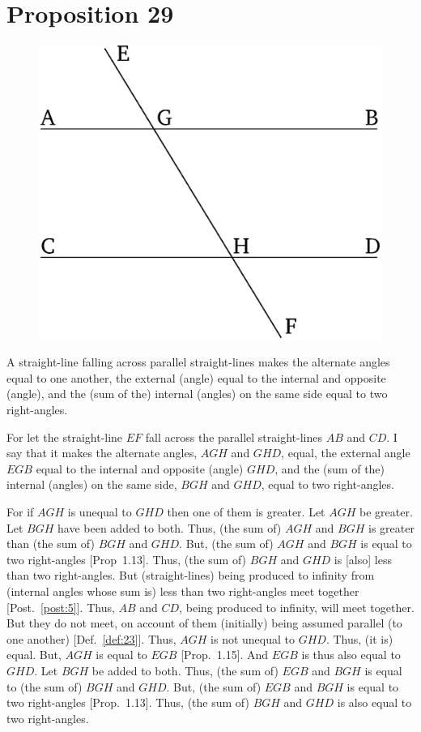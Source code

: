 \chapter*{Proposition 29}


\begin{figure}[ht]
    \begin{center}
    \includegraphics[width=0.5\linewidth]{figures/fig28e.eps}
    \label{fig:prop_29}
    \end{center}
\end{figure}

A straight-line falling across  parallel straight-lines makes the alternate angles
equal to one another,  the external (angle) equal to the internal and
opposite (angle), and the (sum of the) internal (angles) on the same side equal to
two right-angles.

For let the straight-line $EF$ fall across the parallel straight-lines $AB$ and $CD$.
I say that it makes the  alternate angles, $AGH$ and $GHD$,  equal,  the
external angle $EGB$ equal to the internal and opposite (angle) $GHD$,
and the (sum of the) internal (angles) on the same side, $BGH$ and $GHD$, equal to
two right-angles.

For if $AGH$ is unequal to $GHD$ then one of them is greater. Let $AGH$ be greater.
Let $BGH$ have been added to both. Thus, (the sum of) $AGH$ and $BGH$ is greater
than (the sum of) $BGH$ and $GHD$. But, (the sum of) $AGH$ and $BGH$ is equal to two right-angles
[Prop~1.13]. Thus,  (the sum of) $BGH$ and $GHD$ is [also] less than two right-angles. 
But (straight-lines) being produced to infinity from (internal angles whose sum is) less than
two right-angles meet together [Post.~\ref{post:5}]. Thus, $AB$ and $CD$, being produced to
infinity, will meet together. But they do not meet, on account of
them (initially) being assumed parallel (to one another) [Def.~\ref{def:23}]. Thus, $AGH$ is not unequal to $GHD$. Thus, (it is) equal. But, $AGH$ is equal to $EGB$ [Prop.~1.15]. 
And $EGB$ is thus also equal to $GHD$.
Let $BGH$
be added to both. Thus, (the sum of) $EGB$ and $BGH$ is equal to (the sum of) $BGH$ and $GHD$.
But, (the sum of) $EGB$ and $BGH$ is equal to two right-angles [Prop.~1.13]. 
Thus, (the sum of) $BGH$ and $GHD$ is also equal to two right-angles.

